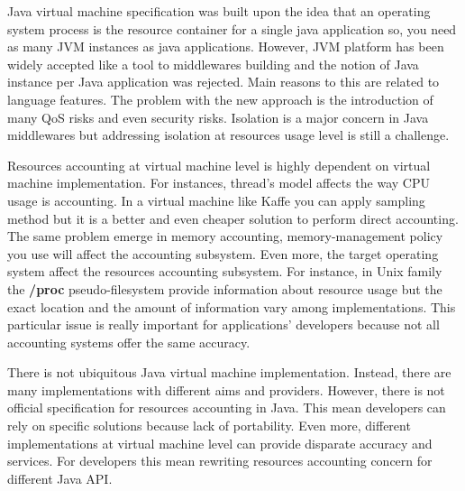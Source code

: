 Java virtual machine specification was built upon the idea that an operating system process is the resource container for a single java application so, you need as many JVM instances as java applications. However, JVM platform has been widely accepted like a tool to middlewares building and the notion of Java instance per Java application was rejected. Main reasons to this are related to language features. The problem with the new approach is the introduction of many QoS risks and even security risks. Isolation is a major concern in Java middlewares but addressing isolation at resources usage level is still a challenge.

Resources accounting at virtual machine level is highly dependent on virtual machine implementation. For instances, thread's model affects the way CPU usage is accounting. In a virtual machine like Kaffe you can apply sampling method \cite{Nagpurkar:2006:ERP:1132462.1132465} but it is a better and even cheaper solution to perform direct accounting. The same problem emerge in memory accounting, memory-management policy you use will affect the accounting subsystem. Even more, the target operating system affect the resources accounting subsystem. For instance, in Unix family the \textbf{/proc} pseudo-filesystem provide information about resource usage but the exact location and the amount of information vary among implementations. This particular issue is really important for applications' developers because not all accounting systems offer the same accuracy.

There is not ubiquitous Java virtual machine implementation. Instead, there are many implementations with different aims and providers. However, there is not official specification for resources accounting in Java. This mean developers can rely on specific solutions because lack of portability. Even more, different implementations at virtual machine level can provide disparate accuracy and services. For developers this mean rewriting resources accounting concern for different Java API.

